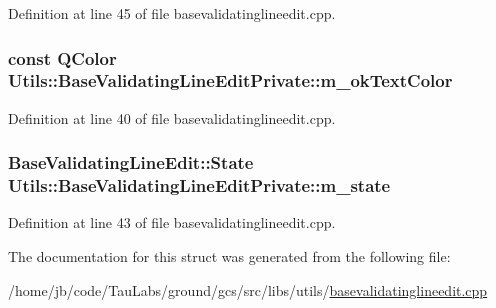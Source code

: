 \-Definition at line 45 of file basevalidatinglineedit.\-cpp.

\hypertarget{struct_utils_1_1_base_validating_line_edit_private_a93a0919e984d20572667722990e1f3ec}{
\subsubsection[{m\-\_\-ok\-Text\-Color}]{\setlength{\rightskip}{0pt plus 5cm}const \-Q\-Color {\bf \-Utils\-::\-Base\-Validating\-Line\-Edit\-Private\-::m\-\_\-ok\-Text\-Color}}}\label{struct_utils_1_1_base_validating_line_edit_private_a93a0919e984d20572667722990e1f3ec}


\-Definition at line 40 of file basevalidatinglineedit.\-cpp.

\hypertarget{struct_utils_1_1_base_validating_line_edit_private_a5f2abc5b382f1099afcd254f43460031}{
\subsubsection[{m\-\_\-state}]{\setlength{\rightskip}{0pt plus 5cm}\-Base\-Validating\-Line\-Edit\-::\-State {\bf \-Utils\-::\-Base\-Validating\-Line\-Edit\-Private\-::m\-\_\-state}}}\label{struct_utils_1_1_base_validating_line_edit_private_a5f2abc5b382f1099afcd254f43460031}


\-Definition at line 43 of file basevalidatinglineedit.\-cpp.



\-The documentation for this struct was generated from the following file\-:\begin{DoxyCompactItemize}
\item 
/home/jb/code/\-Tau\-Labs/ground/gcs/src/libs/utils/\hyperlink{basevalidatinglineedit_8cpp}{basevalidatinglineedit.\-cpp}\end{DoxyCompactItemize}
